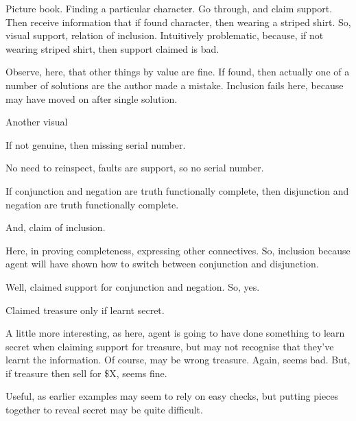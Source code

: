 \begin{note}
  \begin{scenario}
    Picture book.
    Finding a particular character.
    Go through, and claim support.
    Then receive information that if found character, then wearing a striped shirt.
    So, visual support, relation of inclusion.
    Intuitively problematic, because, if not wearing striped shirt, then support claimed is bad.
  \end{scenario}
  Observe, here, that other things by value are fine.
  If found, then actually one of a number of solutions are the author made a mistake.
  Inclusion fails here, because may have moved on after single solution.

  Another visual
  \begin{scenario}
    If not genuine, then missing serial number.
  \end{scenario}
  No need to reinspect, faults are support, so no serial number.
\end{note}

\begin{note}
  \begin{scenario}
    If conjunction and negation are truth functionally complete, then disjunction and negation are truth functionally complete.

    And, claim of inclusion.
  \end{scenario}

  Here, in proving completeness, expressing other connectives.
  So, inclusion because agent will have shown how to switch between conjunction and disjunction.

  Well, claimed support for conjunction and negation.
  So, yes.
\end{note}

\begin{note}[Treasure]
  \begin{scenario}
    Claimed treasure only if learnt secret.
  \end{scenario}
  A little more interesting, as here, agent is going to have done something to learn secret when claiming support for treasure, but may not recognise that they've learnt the information.
  Of course, may be wrong treasure.
  Again, seems bad.
  But, if treasure then sell for \$X, seems fine.

  Useful, as earlier examples may seem to rely on easy checks, but putting pieces together to reveal secret may be quite difficult.
\end{note}

